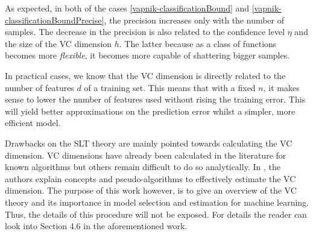 As expected, in both of the cases \ref{vapnik-classificationBound} and  \ref{vapnik-classificationBoundPrecise}, the precision increases only with the number of samples. The decrease in the precision is also related to the confidence level $\eta$ and the size of the VC dimension $h$. The latter because as a class of functions becomes more \textit{flexible}, it becomes more capable of shattering bigger samples. 

In practical cases, we know that the VC dimension is directly related to the number of features $d$ of a training set. This means that with a fixed $n$, it makes sense to lower the number of features used without rising the training error. This will yield better approximations on the prediction error whilst a simpler, more efficient model.

Drawbacks on the SLT theory are mainly pointed towards calculating the VC dimension. VC dimensions have already been calculated in the literature for known algorithms but others remain difficult to do so analytically. In \cite{vapnik-classificationBoundPrecise}, the authors explain concepts and pseudo-algorithms to effectively estimate the VC dimension. The purpose of this work however, is to give an overview of the VC theory and its importance in model selection and estimation for machine learning. Thus, the details of this procedure will not be exposed. For details the reader can look into Section 4.6 in the aforementioned work.
